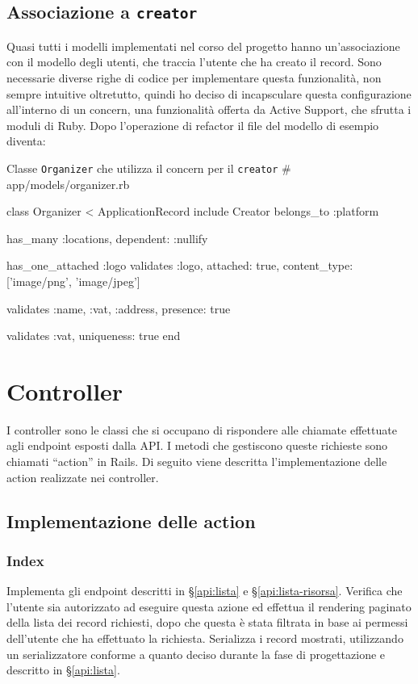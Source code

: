 \subsection{Associazione a \texttt{creator}}
Quasi tutti i modelli implementati nel corso del progetto hanno un'associazione con il modello degli utenti, che traccia l'utente che ha creato il record. Sono necessarie diverse righe di codice per implementare questa funzionalità, non sempre intuitive oltretutto, quindi ho deciso di incapsculare questa configurazione all'interno di un concern, una funzionalità offerta da Active Support, che sfrutta i moduli di Ruby. Dopo l'operazione di refactor il file del modello di esempio diventa:
\begin{code}{Classe \texttt{Organizer} che utilizza il concern per il \texttt{creator}}
# app/models/organizer.rb

class Organizer < ApplicationRecord
  include Creator
  belongs_to :platform
  
  has_many :locations, dependent: :nullify
  
  has_one_attached :logo
  validates :logo, attached: true, content_type: ['image/png', 'image/jpeg']
  
  validates :name,
            :vat,
            :address,
            presence: true

  validates :vat, uniqueness: true
end
\end{code}

\section{Controller}
I controller sono le classi che si occupano di rispondere alle chiamate effettuate agli endpoint esposti dalla API. I metodi che gestiscono queste richieste sono chiamati ``action'' in Rails. Di seguito viene descritta l'implementazione delle action realizzate nei controller.

\subsection{Implementazione delle action}
\subsubsection{Index}
Implementa gli endpoint descritti in \S \ref{api:lista} e \S \ref{api:lista-risorsa}. Verifica che l'utente sia autorizzato ad eseguire questa azione ed effettua il rendering paginato della lista dei record richiesti, dopo che questa è stata filtrata in base ai permessi dell'utente che ha effettuato la richiesta. Serializza i record mostrati, utilizzando un serializzatore conforme a quanto deciso durante la fase di progettazione e descritto in \S \ref{api:lista}.

